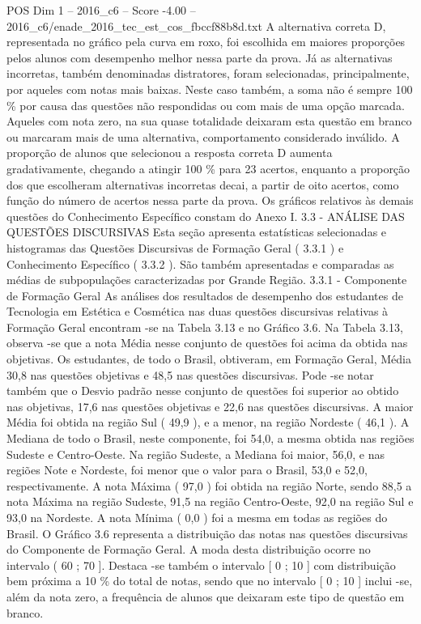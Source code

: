 \begin{textsample}{POS Dim 1 – 2016\_c6 – Score -4.00 – 2016\_c6/enade\_2016\_tec\_est\_cos\_fbccf88b8d.txt}
A alternativa correta D, representada no gráfico pela curva em roxo, foi escolhida em maiores proporções pelos alunos com desempenho melhor nessa parte da prova.
Já as alternativas incorretas, também denominadas distratores, foram selecionadas, principalmente, por aqueles com notas mais baixas.
Neste caso também, a soma não é sempre 100 \% por causa das questões não respondidas ou com mais de uma opção marcada.
Aqueles com nota zero, na sua quase totalidade deixaram esta questão em branco ou marcaram mais de uma alternativa, comportamento considerado inválido.
A proporção de alunos que selecionou a resposta correta D aumenta gradativamente, chegando a atingir 100 \% para 23 acertos, enquanto a proporção dos que escolheram alternativas incorretas decai, a partir de oito acertos, como função do número de acertos nessa parte da prova.
Os gráficos relativos às demais questões do Conhecimento Específico constam do Anexo I. 3.3 - ANÁLISE DAS QUESTÕES DISCURSIVAS Esta seção apresenta estatísticas selecionadas e histogramas das Questões Discursivas de Formação Geral ( 3.3.1 ) e Conhecimento Específico ( 3.3.2 ).
São também apresentadas e comparadas as médias de subpopulações caracterizadas por Grande Região. 3.3.1 - Componente de Formação Geral As análises dos resultados de desempenho dos estudantes de Tecnologia em Estética e Cosmética nas duas questões discursivas relativas à Formação Geral encontram -se na Tabela 3.13 e no Gráfico 3.6.
Na Tabela 3.13, observa -se que a nota Média nesse conjunto de questões foi acima da obtida nas objetivas.
Os estudantes, de todo o Brasil, obtiveram, em Formação Geral, Média 30,8 nas questões objetivas e 48,5 nas questões discursivas.
Pode -se notar também que o Desvio padrão nesse conjunto de questões foi superior ao obtido nas objetivas, 17,6 nas questões objetivas e 22,6 nas questões discursivas.
A maior Média foi obtida na região Sul ( 49,9 ), e a menor, na região Nordeste ( 46,1 ).
A Mediana de todo o Brasil, neste componente, foi 54,0, a mesma obtida nas regiões Sudeste e Centro-Oeste.
Na região Sudeste, a Mediana foi maior, 56,0, e nas regiões Note e Nordeste, foi menor que o valor para o Brasil, 53,0 e 52,0, respectivamente.
A nota Máxima ( 97,0 ) foi obtida na região Norte, sendo 88,5 a nota Máxima na região Sudeste, 91,5 na região Centro-Oeste, 92,0 na região Sul e 93,0 na Nordeste.
A nota Mínima ( 0,0 ) foi a mesma em todas as regiões do Brasil.
O Gráfico 3.6 representa a distribuição das notas nas questões discursivas do Componente de Formação Geral.
A moda desta distribuição ocorre no intervalo ( 60 ; 70 ].
Destaca -se também o intervalo [ 0 ; 10 ] com distribuição bem próxima a 10 \% do total de notas, sendo que no intervalo [ 0 ; 10 ] inclui -se, além da nota zero, a frequência de alunos que deixaram este tipo de questão em branco.

\end{textsample}
